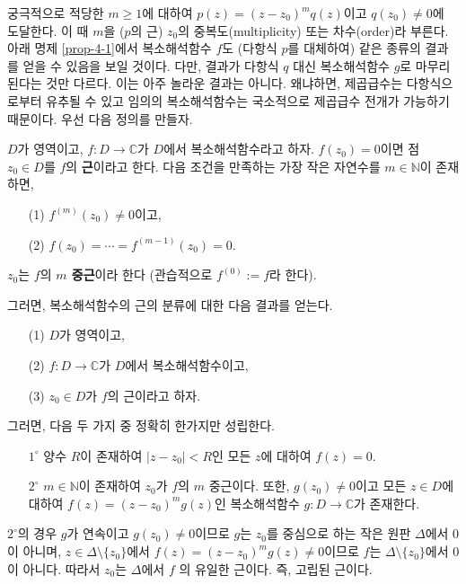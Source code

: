 궁극적으로 적당한 $m\ge1$에 대하여 $p(z) = (z-z_0)^mq(z)$이고  $q(z_0)\ne0$에 도달한다.
이 때 $m$을 ($p$의 근) $z_0$의 중복도(multiplicity) 또는 차수(order)라 부른다.
아래 명제 \ref{prop-4-1}에서 복소해석함수 $f$도 (다항식 $p$를 대체하여)
같은 종류의 결과를 얻을 수 있음을 보일 것이다.
다만, 결과가 다항식 $q$ 대신 복소해석함수 $g$로 마무리된다는 것만 다르다.
이는 아주 놀라운 결과는 아니다. 왜냐하면, 제곱급수는 다항식으로부터 유추될 수 있고
임의의 복소해석함수는 국소적으로 제곱급수 전개가 가능하기 때문이다.
우선 다음 정의를 만들자.

\begin{saltdefinition}{}{} \label{def-4-2}
$D$가 영역이고, $f:D\to\mathbb C$가 $D$에서 복소해석함수라고 하자.
$f(z_0)=0$이면 점 $z_0\in D$를 $f$의 {\bf 근}이라고 한다.
다음 조건을 만족하는 가장 작은 자연수를 $m\in\mathbb N$이 존재하면,
\begin{itemize}
\item[(1)] $f^{(m)}(z_0) \ne 0$이고,
\item[(2)] $f(z_0) = \cdots = f^{(m-1)}(z_0) = 0$.
\end{itemize}
$z_0$는 $f$의 {\bf $m$ 중근}이라 한다
(관습적으로 $f^{(0)} := f$라 한다).
\end{saltdefinition}

그러면, 복소해석함수의 근의 분류에 대한 다음 결과를 얻는다.

\newpage %

\begin{saltprop} [근의 분류]{}{} \label{prop-4-1}
\begin{itemize}
\item[(1)] $D$가 영역이고,
\item[(2)] $f:D\to\mathbb C$가 $D$에서 복소해석함수이고,
\item[(3)] $z_0 \in D$가 $f$의 근이라고 하자.
\end{itemize}
그러면, 다음 두 가지 중 정확히 한가지만 성립한다.
\begin{itemize}
\item[$1^\circ$] 양수 $R$이 존재하여 $|z-z_0|<R$인 모든 $z$에 대하여
$f(z)=0$.
\item[$2^\circ$] $m\in\mathbb N$이 존재하여
 $z_0$가 $f$의 $m$ 중근이다. 또한, 
 $g(z_0)\ne0$이고 모든 $z\in D$에 대하여 $f(z) = (z-z_0)^mg(z)$인
 복소해석함수 $g:D\to\mathbb C$가 존재한다.
\end{itemize}
\end{saltprop}

$2^\circ$의 경우 $g$가 연속이고 $g(z_0)\ne0$이므로
$g$는 $z_0$를 중심으로 하는 작은 원판 $\Delta$에서 $0$이 아니며,
$z\in \Delta\setminus \{z_0\}$에서 $f(z) = (z-z_0)^mg(z) \ne 0$이므로
$f$는 $\Delta\setminus \{z_0\}$에서 $0$이 아니다.
따라서 $z_0$는 $\Delta$에서 $f$ 의 유일한 근이다. 즉, 고립된 근이다.

